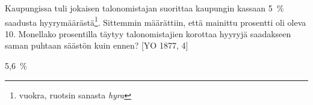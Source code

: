 \begin{tehtava}
 Kaupungissa tuli jokaisen talonomistajan suorittaa kaupungin kassaan 5~\% saadusta hyyrymäärästä\footnote{vuokra, ruotsin sanasta \emph{hyra}}. Sittemmin määrättiin, että mainittu prosentti oli oleva 10. Monellako prosentilla täytyy talonomistajien korottaa hyyryjä saadakseen saman puhtaan säästön kuin ennen? [YO 1877, 4]
    \begin{vastaus}
5,6~\%
    \end{vastaus}
\end{tehtava}
